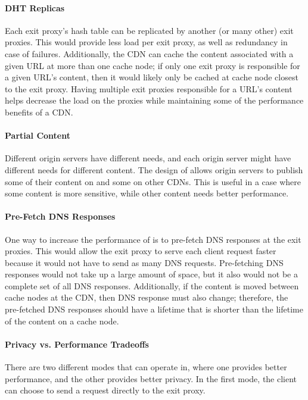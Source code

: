 \paragraph{DHT Replicas}
Each exit proxy's hash table can be replicated by another (or many other) exit proxies.  This 
would provide less load per exit proxy, as well as redundancy in case of failures.  Additionally, 
the CDN can cache the content associated with a given URL at more than one cache
node;
if only one exit proxy is responsible for a given URL's content, then it would likely only be cached at 
cache node closest to the exit proxy.  Having multiple exit proxies responsible for a URL's content 
helps decrease the load on the proxies while maintaining some of the performance benefits of a CDN.

\paragraph{Partial Content}
Different origin servers have different needs, and each origin server might 
have different needs for different content.  The design of \system{} allows origin servers
 to publish some of their content on \system{} and some on other CDNs.  
This is useful in a case where some content is more sensitive, while other content needs 
better performance.

\paragraph{Pre-Fetch DNS Responses} 
One way to increase the performance of \system{} is to pre-fetch DNS responses at 
the exit proxies.  This would allow the exit proxy to serve each client request faster 
because it would not have to send as many DNS requests.  Pre-fetching DNS responses would 
not take up a large amount of space, but it also would not be a complete set of all DNS 
responses.  Additionally, if the content is moved between cache nodes at the CDN, then DNS 
response must also change; therefore, the pre-fetched DNS responses should have a lifetime 
that is shorter than the lifetime of the content on a cache node.

\paragraph{Privacy vs. Performance Tradeoffs}
There are two different modes that \system{} can operate in, where one provides better 
performance, and the other provides better privacy.  In the first mode, the client can 
choose to send a request directly to the exit proxy.  

